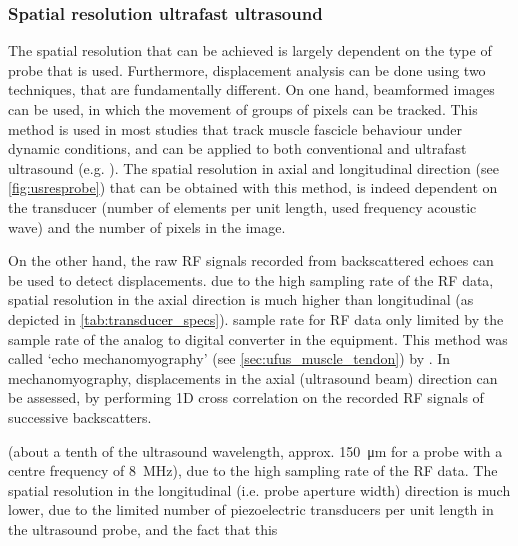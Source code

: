 \subsubsection{Spatial resolution ultrafast ultrasound}
The spatial resolution that can be achieved is largely dependent on the type of probe that is used. Furthermore, displacement analysis can be done using two techniques, that are fundamentally different. On one hand, beamformed images can be used, in which the movement of groups of pixels can be tracked. This method is used in most studies that track muscle fascicle behaviour under dynamic conditions, and can be applied to both conventional and ultrafast ultrasound (e.g. \cite{farris_ultratrack_2016, farcy_interaction_2014, hauraix_muscle_2017, af_klint_sudden_2009, cronin_triceps_2015, cronin_automatic_2011}). The spatial resolution in axial and longitudinal direction (see \autoref{fig:usresprobe}) that can be obtained with this method, is indeed dependent on the transducer (number of elements per unit length, used frequency acoustic wave) and the number of pixels in the image. 

\tred[draft:] On the other hand, the raw RF signals recorded from backscattered echoes can be used to detect displacements.  due to the high sampling rate of the RF data, spatial resolution in the axial direction is much higher than longitudinal (as depicted in \autoref{tab:transducer_specs}). sample rate for RF data only limited by the sample rate of the analog to digital converter in the equipment. This method was called `echo mechanomyography' (see \autoref{sec:ufus_muscle_tendon}) by \citet{deffieux_assessment_2008}. In mechanomyography, \tred[only] displacements in the axial (ultrasound beam) direction can be assessed, by performing 1D cross correlation on the recorded RF signals of successive backscatters. 

(about a tenth of the ultrasound wavelength, approx. \SI{150}{\micro\meter} for a probe with a centre frequency of \SI{8}{\mega\hertz}), due to the high sampling rate of the RF data. The spatial resolution in the longitudinal (i.e. probe aperture width) direction is much lower, due to the limited number of piezoelectric transducers per unit length in the ultrasound probe, and the fact that this 

